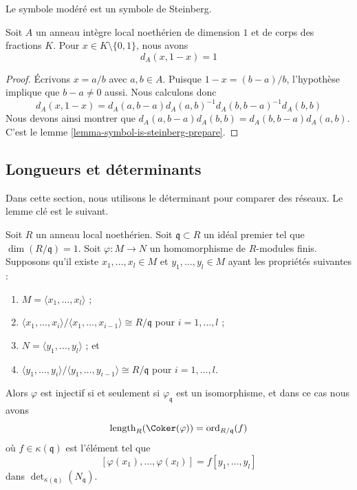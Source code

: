 \noindent
Le symbole modéré est un symbole de Steinberg.

\begin{lemma}
\label{lemma-symbol-is-steinberg}
Soit $A$ un anneau intègre local noethérien de dimension $1$
et de corps des fractions $K$. Pour $x \in K \setminus \{0, 1\}$,
nous avons
$$
d_A(x, 1 -x) = 1
$$
\end{lemma}

\begin{proof}
Écrivons $x = a/b$ avec $a, b \in A$.
Puisque $1 - x = (b - a)/b$, l'hypothèse implique
que $b - a \not = 0$ aussi. Nous calculons donc
$$
d_A(x, 1 - x)
=
d_A(a, b - a)d_A(a, b)^{-1}d_A(b, b - a)^{-1}d_A(b, b)
$$
Nous devons ainsi montrer que
$d_A(a, b - a) d_A(b, b) = d_A(b, b - a) d_A(a, b)$.
C'est le lemme \ref{lemma-symbol-is-steinberg-prepare}.
\end{proof}










\subsection{Longueurs et déterminants}
\label{subsection-length-determinant}

\noindent
Dans cette section, nous utilisons le déterminant pour comparer des réseaux.
Le lemme clé est le suivant.

\begin{lemma}
\label{lemma-key-lemma}
Soit $R$ un anneau local noethérien.
Soit $\mathfrak q \subset R$ un idéal premier tel que $\dim(R/\mathfrak q) = 1$.
Soit $\varphi : M \to N$ un homomorphisme de $R$-modules finis.
Supposons qu'il existe $x_1, \ldots, x_l \in M$ et $y_1, \ldots, y_l \in M$
ayant les propriétés suivantes :
\begin{enumerate}
\item $M = \langle x_1, \ldots, x_l\rangle$ ;
\item $\langle x_1, \ldots, x_i\rangle / \langle x_1, \ldots, x_{i - 1}\rangle
\cong R/\mathfrak q$ pour $i = 1, \ldots, l$ ;
\item $N = \langle y_1, \ldots, y_l\rangle$ ; et
\item $\langle y_1, \ldots, y_i\rangle / \langle y_1, \ldots, y_{i - 1}\rangle
\cong R/\mathfrak q$ pour $i = 1, \ldots, l$.
\end{enumerate}
Alors $\varphi$ est injectif si et seulement si $\varphi_{\mathfrak q}$ est un
isomorphisme, et dans ce cas nous avons
$$
\text{length}_R(\Coker(\varphi)) = \text{ord}_{R/\mathfrak q}(f)
$$
où $f \in \kappa(\mathfrak q)$ est l'élément tel que
$$
[\varphi(x_1), \ldots, \varphi(x_l)] = f [y_1, \ldots, y_l]
$$
dans $\det_{\kappa(\mathfrak q)}(N_{\mathfrak q})$.
\end{lemma}


